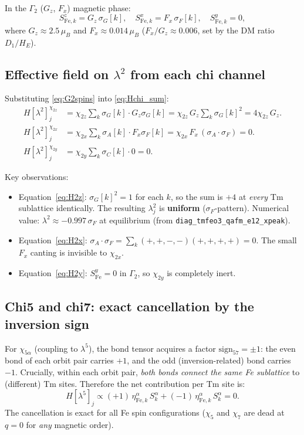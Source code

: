 \documentclass[11pt,a4paper]{article}
\newcommand{\sF}{\sigma_F}
\newcommand{\sG}{\sigma_G}
\newcommand{\sA}{\sigma_A}
\newcommand{\sC}{\sigma_C}
\newcommand{\lamt}{\lambda^2}
\newcommand{\Gtwo}{\Gamma_2}
\begin{document}
In the $\Gtwo$ ($G_z$, $F_x$) magnetic phase:
\begin{equation}
  S^z_{\mathrm{Fe},k} = G_z\,\sG[k], \quad
  S^x_{\mathrm{Fe},k} = F_x\,\sF[k], \quad
  S^y_{\mathrm{Fe},k} = 0,
  \label{eq:G2spins}
\end{equation}
where $G_z \approx 2.5\,\mu_B$ and $F_x \approx 0.014\,\mu_B$
($F_x/G_z \approx 0.006$, set by the DM ratio $D_1/H_E$).

\subsection{Effective field on $\lamt$ from each chi channel}

Substituting \eqref{eq:G2spins} into \eqref{eq:Hchi_sum}:
\begin{align}
  H[\lamt]_j^{\chi_{2z}}
    &= \chi_{2z}\sum_{k}\sG[k]\cdot G_z\sG[k]
     = \chi_{2z}\,G_z\sum_{k}\sG[k]^2
     = 4\chi_{2z}\,G_z.
  \label{eq:H2z}\\[4pt]
  H[\lamt]_j^{\chi_{2x}}
    &= \chi_{2x}\sum_{k}\sA[k]\cdot F_x\sF[k]
     = \chi_{2x}\,F_x\,(\sA\cdot\sF) = 0.
  \label{eq:H2x}\\[4pt]
  H[\lamt]_j^{\chi_{2y}}
    &= \chi_{2y}\sum_{k}\sC[k]\cdot 0 = 0.
  \label{eq:H2y}
\end{align}

Key observations:
\begin{itemize}
  \item Equation~\eqref{eq:H2z}: $\sG[k]^2 = 1$ for each $k$, so the sum
    is $+4$ at \emph{every} Tm sublattice identically.
    The resulting $\lamt_j$ is \textbf{uniform} ($\sF$-pattern).
    Numerical value: $\lamt \approx -0.997\,\sF$ at equilibrium
    (from \texttt{diag\_tmfeo3\_qafm\_e12\_xpeak}).
  \item Equation~\eqref{eq:H2x}: $\sA\cdot\sF = \sum_k(+,+,-,-)(+,+,+,+)= 0$.
    The small $F_x$ canting is invisible to $\chi_{2x}$.
  \item Equation~\eqref{eq:H2y}: $S^y_{\mathrm{Fe}}=0$ in $\Gtwo$, so
    $\chi_{2y}$ is completely inert.
\end{itemize}

\subsection{Chi5 and chi7: exact cancellation by the inversion sign}

For $\chi_{5\alpha}$ (coupling to $\lambda^5$), the bond tensor acquires
a factor $\mathrm{sign}_{57} = \pm1$: the even bond of each orbit pair
carries $+1$, and the odd (inversion-related) bond carries $-1$.  Crucially,
within each orbit pair, \emph{both bonds connect the same Fe sublattice} to
(different) Tm sites.  Therefore the net contribution per Tm site is:
\begin{equation}
  H[\lambda^5]_j \propto (+1)\,\eta^\alpha_{\mathrm{Fe},k}\,S^\alpha_k
                        + (-1)\,\eta^\alpha_{\mathrm{Fe},k}\,S^\alpha_k = 0.
\end{equation}
The cancellation is exact for all Fe spin configurations ($\chi_5$ and
$\chi_7$ are dead at $q=0$ for \emph{any} magnetic order).
\end{document}

